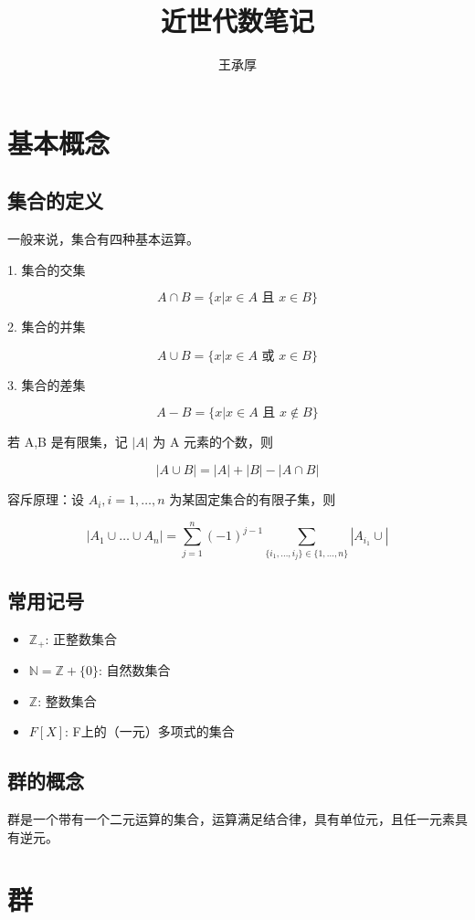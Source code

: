 \documentclass{ctexart}
\title{近世代数笔记}
\author{王承厚}
\begin{document}
\maketitle
\section{基本概念}
\subsection{集合的定义}
一般来说，集合有四种基本运算。

1. 集合的交集

\[
    A \cap B = \{ x |  x \in A \textbf{ 且 } x \in B \}
\]

2. 集合的并集

\[
    A \cup B = \{ x |  x \in A \textbf{ 或 } x \in B \}
\]

3. 集合的差集

\[
    A - B = \{ x |  x \in A \textbf{ 且 } x \notin B \}
\]

若 A,B 是有限集，记 $|A|$ 为 A 元素的个数，则

\[
    |A \cup B| = |A| + |B| - |A \cap B|
\]

容斥原理：设 $A_i, i = 1,\ldots,n$ 为某固定集合的有限子集，则

\[
    |A_1 \cup \ldots \cup A_n| = \sum_{j=1}^{n}(-1)^{j-1} \sum_{\{i_1,\ldots,i_j\} \in \{1,\ldots,n\}}|A_{i_1} \cup|
\]

\subsection{常用记号}

\begin{itemize}
    \item $\mathbb{Z}_+$: 正整数集合
    \item $\mathbb{N} = \mathbb{Z} + \{0\}$: 自然数集合
    \item $\mathbb{Z}$: 整数集合
    \item $F[X]$: F上的（一元）多项式的集合
\end{itemize}

\subsection{群的概念}

群是一个带有一个二元运算的集合，运算满足结合律，具有单位元，且任一元素具有逆元。

\section{群}
\end{document}
